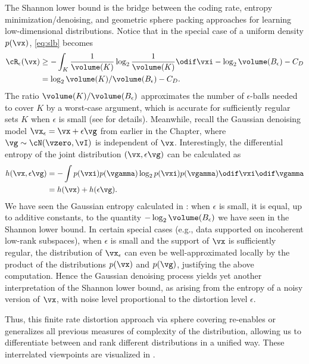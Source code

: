 \documentclass[../../book-main.tex]{subfiles}
\begin{document}
\begin{remark}
    The Shannon lower bound is the bridge between the coding rate, entropy
    minimization/denoising, and geometric sphere packing approaches for learning
    low-dimensional distributions. Notice that in the special case of a uniform
    density $p(\vx)$, \eqref{eq:slb} becomes
    \begin{align}
        \cR_{\epsilon}(\vx) &\geq -\int_K \frac{1}{\volume(K)} \log_2
        \frac{1}{\volume(K)} \odif \vxi
        - \log_2 \volume(B_{\epsilon}) - C_D
        \\
        &=
        \log_2 \volume(K) / \volume(B_{\epsilon})
        - C_D. \label{eq:shannon-lower-bound-uniform}
    \end{align}
    The ratio $\volume(K) / \volume(B_{\epsilon})$ approximates the number of
    $\epsilon$-balls needed to cover $K$ by a worst-case argument, which is
    accurate for sufficiently regular sets $K$ when $\epsilon$ is small (see
     for details).
    Meanwhile, recall the Gaussian denoising model $\vx_{\epsilon} = \vx
    + \epsilon \vg$ from
    earlier in the Chapter, where $\vg \sim \cN(\vzero, \vI)$ is independent of
    $\vx$.
    Interestingly, the differential entropy of the joint distribution $(\vx,
    \epsilon\vg)$
    can be calculated as
    \begin{align}
        h(\vx, \epsilon\vg)
        &=
        -\int
        p(\vxi) p(\vgamma) \log_2 p(\vxi) p(\vgamma) \odif \vxi \odif \vgamma
        \\
        &=
        h(\vx) + h(\epsilon \vg).
    \end{align}
    We have seen the Gaussian entropy calculated in
    : when $\epsilon$ is small, it is equal, up
    to additive constants, to the quantity $-\log_2
    \volume(B_{\epsilon})$ we have seen in the Shannon lower bound.
    In certain special cases (e.g., data supported on incoherent
    low-rank subspaces),
    when $\epsilon$ is small and the support of $\vx$ is sufficiently regular,
    the distribution of $\vx_{\epsilon}$ can even be well-approximated
    locally by the
    product of the distributions $p(\vx)$ and $p(\vg)$, justifying the above
    computation.
    Hence the Gaussian denoising process yields yet another interpretation of
    the Shannon lower bound, as arising from the entropy of a noisy version of
    $\vx$, with noise level proportional to the distortion level $\epsilon$.

    Thus, this finite rate distortion approach via sphere covering re-enables or
    generalizes all previous measures of complexity of the
    distribution, allowing us
    to differentiate between and rank different distributions in a unified way.
    These interrelated viewpoints are visualized in .
\end{remark}
\end{document}
